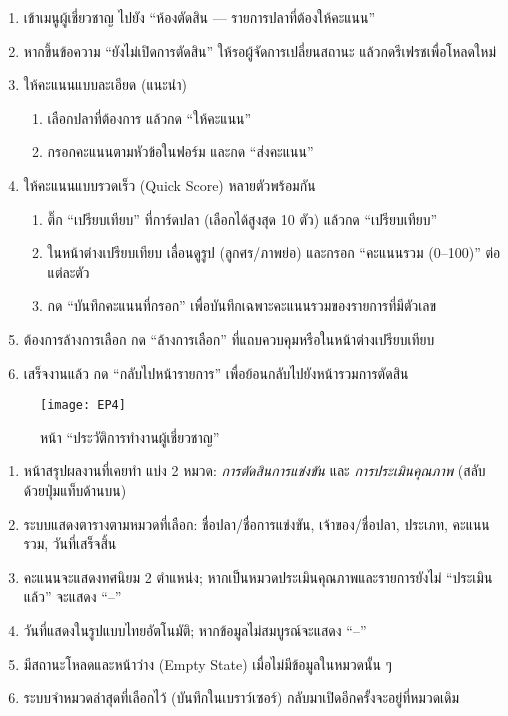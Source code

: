 \par

\begin{sloppypar}
	\begin{enumerate}
		\item เข้าเมนูผู้เชี่ยวชาญ ไปยัง “ห้องตัดสิน — รายการปลาที่ต้องให้คะแนน”
		\item หากขึ้นข้อความ “ยังไม่เปิดการตัดสิน” ให้รอผู้จัดการเปลี่ยนสถานะ แล้วกดรีเฟรชเพื่อโหลดใหม่
		\item ให้คะแนนแบบละเอียด (แนะนำ)
		\begin{enumerate}
			\item เลือกปลาที่ต้องการ แล้วกด “ให้คะแนน”
			\item กรอกคะแนนตามหัวข้อในฟอร์ม และกด “ส่งคะแนน”
		\end{enumerate}
		\item ให้คะแนนแบบรวดเร็ว (Quick Score) หลายตัวพร้อมกัน
		\begin{enumerate}
			\item ติ๊ก “เปรียบเทียบ” ที่การ์ดปลา (เลือกได้สูงสุด 10 ตัว) แล้วกด “เปรียบเทียบ”
			\item ในหน้าต่างเปรียบเทียบ เลื่อนดูรูป (ลูกศร/ภาพย่อ) และกรอก “คะแนนรวม (0–100)” ต่อแต่ละตัว
			\item กด “บันทึกคะแนนที่กรอก” เพื่อบันทึกเฉพาะคะแนนรวมของรายการที่มีตัวเลข
		\end{enumerate}
		\item ต้องการล้างการเลือก กด “ล้างการเลือก” ที่แถบควบคุมหรือในหน้าต่างเปรียบเทียบ
		\item เสร็จงานแล้ว กด “กลับไปหน้ารายการ” เพื่อย้อนกลับไปยังหน้ารวมการตัดสิน
	\end{enumerate}
\end{sloppypar}


\begin{figure}[h]
	\centering
	\texttt{[image: EP4]}
	\caption{หน้า “ประวัติการทำงานผู้เชี่ยวชาญ”}
\end{figure}

\par
\begin{sloppypar}
	\begin{enumerate}
		\item หน้าสรุปผลงานที่เคยทำ แบ่ง 2 หมวด: \textit{การตัดสินการแข่งขัน} และ \textit{การประเมินคุณภาพ} (สลับด้วยปุ่มแท็บด้านบน)
		\item ระบบแสดงตารางตามหมวดที่เลือก: ชื่อปลา/ชื่อการแข่งขัน, เจ้าของ/ชื่อปลา, ประเภท, คะแนนรวม, วันที่เสร็จสิ้น
		\item คะแนนจะแสดงทศนิยม 2 ตำแหน่ง; หากเป็นหมวดประเมินคุณภาพและรายการยังไม่ “ประเมินแล้ว” จะแสดง “–”
		\item วันที่แสดงในรูปแบบไทยอัตโนมัติ; หากข้อมูลไม่สมบูรณ์จะแสดง “–”
		\item มีสถานะโหลดและหน้าว่าง (Empty State) เมื่อไม่มีข้อมูลในหมวดนั้น ๆ
		\item ระบบจำหมวดล่าสุดที่เลือกไว้ (บันทึกในเบราว์เซอร์) กลับมาเปิดอีกครั้งจะอยู่ที่หมวดเดิม
	\end{enumerate}
\end{sloppypar}

